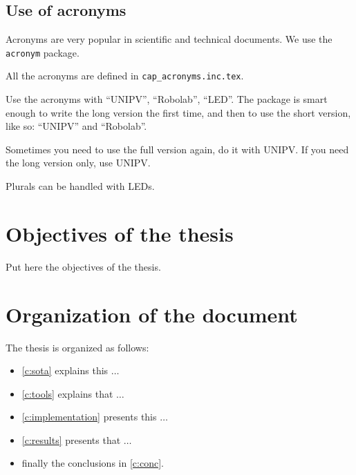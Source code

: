 \subsection{Use of acronyms}

Acronyms are very popular in scientific and technical documents.
We use the \texttt{acronym} package.

All the acronyms are defined in \texttt{cap\_acronyms.inc.tex}.

Use the acronyms with \enquote{\ac{UNIPV}}, \enquote{\ac{Robolab}}, \enquote{\ac{LED}}.
The package is smart enough to write the long version the first time, and then to use the short version, like so: \enquote{\ac{UNIPV}} and \enquote{\ac{Robolab}}.

Sometimes you need to use the full version again, do it with \acf{UNIPV}.
If you need the long version only, use \acl{UNIPV}.

Plurals can be handled with \acp{LED}.

\section{Objectives of the thesis}

%
%
Put here the objectives of the thesis.

\section{Organization of the document}

The thesis is organized as follows:

%
%
\begin{itemize}
\item \cref{c:sota} explains this $\ldots$
\item \cref{c:tools} explains that $\ldots$
\item \cref{c:implementation} presents this $\ldots$
\item \cref{c:results} presents that $\ldots$
\item finally the conclusions in \cref{c:conc}.
\end{itemize}
\fi

